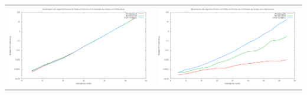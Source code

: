 \bc
\begin{tabular}{l c}
\includegraphics[scale=0.16]{finales/rendimientoExactoSinPoda4Particiones.png}
&
\includegraphics[scale=0.16]{finales/rendimientoExactoConPoda4Particiones.png}
\end{tabular}
\ec

